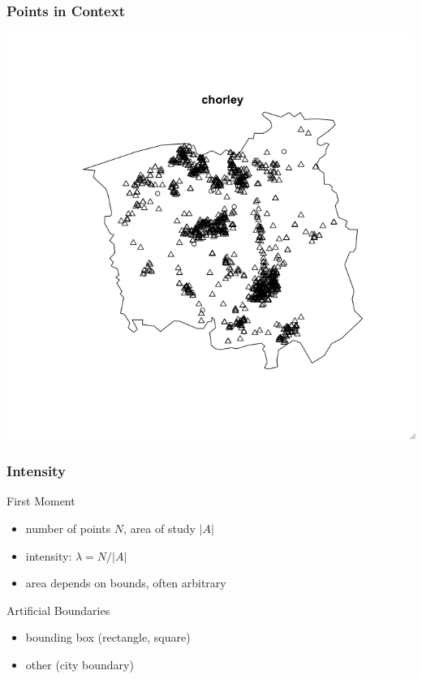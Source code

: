 \documentclass[nototal]{beamer}
\begin{document}
\begin{frame}
     \frametitle{Points in Context}
     \begin{center}
       \includegraphics[width=.65\linewidth]{chorleypoly.png}
     \end{center}
   \end{frame}

   \begin{frame}
     \frametitle{Intensity}
     \begin{block}{First Moment}
       \begin{itemize}
	 \item number of points $N$, area of study $|A|$
	 \item intensity: $\lambda = N/|A|$
	 \item area depends on bounds, often arbitrary
       \end{itemize}
      \end{block}
     \begin{block}{Artificial Boundaries}
       \begin{itemize}
	 \item bounding box (rectangle, square)
	 \item other (city boundary)
       \end{itemize}
      \end{block}
    \end{frame}

\end{document}
